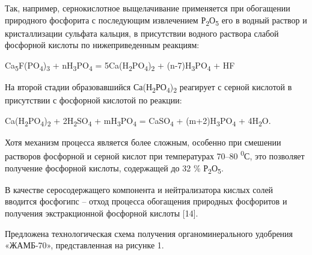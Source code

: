 \begin{multicols}{2}
Так, например, сернокислотное выщелачивание применяется при обогащении
природного фосфорита с последующим извлечением
Р\textsubscript{2}О\textsubscript{5} его в водный раствор и
кристаллизации сульфата кальция, в присутствии водного раствора слабой
фосфорной кислоты по нижеприведенным реакциям:

Ca\textsubscript{5}F(PO\textsubscript{4})\textsubscript{3} +
nH\textsubscript{3}PO\textsubscript{4} =
5Ca(H\textsubscript{2}PO\textsubscript{4})\textsubscript{2} +
(n-7)H\textsubscript{3}PO\textsubscript{4} + HF

На второй стадии образовавшийся
Са(Н\textsubscript{2}РО\textsubscript{4})\textsubscript{2} реагирует с
серной кислотой в присутствии с фосфорной кислотой по реакции:

Ca(H\textsubscript{2}PO\textsubscript{4})\textsubscript{2} +
2H\textsubscript{2}SO\textsubscript{4} +
mH\textsubscript{3}PO\textsubscript{4} = CaSO\textsubscript{4} +
(m+2)H\textsubscript{3}PO\textsubscript{4} + 4H\textsubscript{2}O.

Хотя механизм процесса является более сложным, особенно при смешении
растворов фосфорной и серной кислот при температурах 70--80
\textsuperscript{0}С, это позволяет получение фосфорной кислоты,
содержащей до 32 \% Р\textsubscript{2}О\textsubscript{5}.

В качестве серосодержащего компонента и нейтрализатора кислых солей
вводится фосфогипс -- отход процесса обогащения природных фосфоритов и
получения экстракционной фосфорной кислоты {[}14{]}.

Предложена технологическая схема получения органоминерального удобрения
«ЖАМБ-70», представленная на рисунке 1.
\end{multicols}

